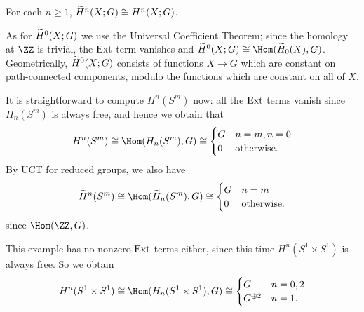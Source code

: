 \documentclass[11pt]{scrreprt}
\begin{document}
\begin{ques}
	For each $n \ge 1$, $\widetilde H^n(X;G) \cong H^n(X;G)$.
\end{ques}

As for $\widetilde H^0(X;G)$ we use the Universal Coefficient Theorem;
since the homology at $\ZZ$ is trivial, the $\operatorname{Ext}$ term vanishes and
$\wt H^0(X;G) \cong \Hom(\wt H_0(X), G)$.
Geometrically, $\widetilde H^0(X;G)$ consists of functions $X \to G$
which are constant on path-connected components,
modulo the functions which are constant on all of $X$.

\begin{example}
	It is straightforward to compute $H^n(S^m)$ now:
	all the $\operatorname{Ext}$ terms vanish since $H_n(S^m)$ is always free,
	and hence we obtain that 
	\[ H^n(S^m) \cong \Hom(H_n(S^m), G) \cong
		\begin{cases}
			G & n=m, n=0 \\
			0 & \text{otherwise}.
		\end{cases}
	\]
	By UCT for reduced groups, we also have
	\[ \wt H^n(S^m) \cong \Hom(\wt H_n(S^m), G) \cong
		\begin{cases}
			G & n=m \\
			0 & \text{otherwise}.
		\end{cases}
	\]
	since $\Hom(\ZZ, G)$.
\end{example}

\begin{example}
	This example has no nonzero $\operatorname{Ext}$ terms either,
	since this time $H^n(S^1 \times S^1)$ is always free.
	So we obtain
	\[ H^n(S^1 \times S^1) \cong \Hom(H_n(S^1 \times S^1), G)
		\cong
		\begin{cases}
			G & n = 0,2 \\
			G^{\oplus 2} & n = 1.
		\end{cases}
	\]
\end{example}
\end{document}
